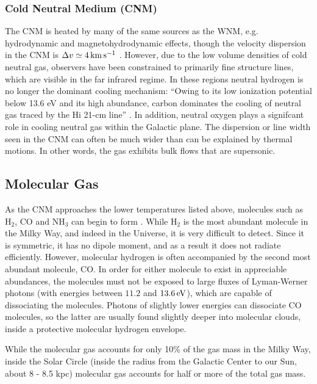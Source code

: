 \documentclass[../dissertation.tex]{subfiles}
\begin{document}
\subsubsection{Cold Neutral Medium (CNM)}
The CNM is heated by many of the same sources as the WNM, 
e.g. hydrodynamic and magnetohydrodynamic effects, though the velocity dispersion in the CNM is $\Delta v \simeq 4 \,\rm km\,s^{-1}$ \citep[p. 49]{2009ARA&A..47...27K}.
However, due to the low volume densities of cold neutral gas, observers have been constrained to 
primarily fine structure lines, which are visible in the far infrared regime. 
In these regions neutral hydrogen is no longer the dominant cooling mechanism: 
``Owing to its low ionization potential below 13.6 eV and its high abundance, carbon dominates the cooling of neutral gas traced by the Hi 21-cm line'' \citep[p. 48]{2009ARA&A..47...27K}. 
In addition, neutral oxygen plays a signifcant role in cooling neutral gas within the Galactic plane. The dispersion or line width seen in the CNM can often be much wider than can be explained by thermal motions. In other words, the gas exhibits bulk flows that are supersonic. 


\subsection{Molecular Gas} \label{subsec:intro_molecular_gas}
As the CNM approaches the lower temperatures listed above, molecules such as H$_2$, CO and NH$_3$ can begin to form \citep[p. 47]{2009ARA&A..47...27K}. While H$_2$ is the most abundant molecule in the Milky Way, and indeed in the Universe, it is very difficult to detect. Since it is symmetric, it has no dipole moment, and as a result it does not radiate efficiently. However, molecular hydrogen is often accompanied by the second most abundant molecule, CO. In order for either molecule to exist in appreciable abundances, the molecules must not be exposed to large fluxes of Lyman-Werner photons (with energies between $11.2$ and $13.6\,{\rm eV}$), which are capable of dissociating the molecules. Photons of slightly lower energies can dissociate CO molecules, so the latter are usually found slightly deeper into molecular clouds, inside a protective molecular hydrogen envelope.

While the molecular gas accounts for only 10\% of the gas mass in the Milky Way, inside the Solar Circle (inside the radius from the Galactic Center to our Sun, about 8 - 8.5 kpc) 
molecular gas accounts for half or more of the total gas mass. 
\end{document}
